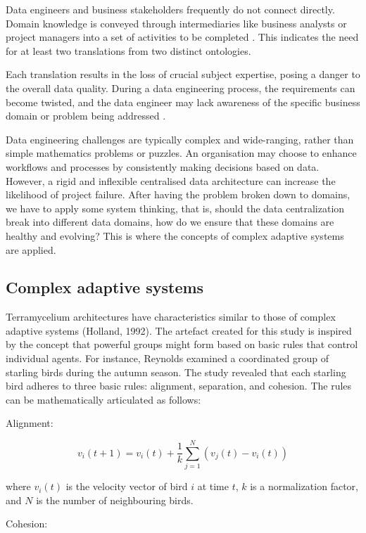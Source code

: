 \documentclass{ieeeaccess}
\begin{document}
Data engineers and business stakeholders frequently do not connect directly. Domain knowledge is conveyed through intermediaries like business analysts or project managers into a set of activities to be completed \cite{khrononov2021learning}. This indicates the need for at least two translations from two distinct ontologies.

Each translation results in the loss of crucial subject expertise, posing a danger to the overall data quality. During a data engineering process, the requirements can become twisted, and the data engineer may lack awareness of the specific business domain or problem being addressed \cite{khononov2021learning}.

Data engineering challenges are typically complex and wide-ranging, rather than simple mathematics problems or puzzles. An organisation may choose to enhance workflows and processes by consistently making decisions based on data. However, a rigid and inflexible centralised data architecture can increase the likelihood of project failure. After having the problem broken down to domains, we have to apply some system thinking, that is, should the data centralization break into different data domains, how do we ensure that these domains are healthy and evolving? This is where the concepts of complex adaptive systems are applied.

\subsection{Complex adaptive systems}

Terramycelium architectures have characteristics similar to those of complex adaptive systems (Holland, 1992). The artefact created for this study is inspired by the concept that powerful groups might form based on basic rules that control individual agents. For instance, Reynolds \cite{reynolds1987flocks} examined a coordinated group of starling birds during the autumn season. The study revealed that each starling bird adheres to three basic rules: alignment, separation, and cohesion. The rules can be mathematically articulated as follows:

Alignment:

$$ v_i(t+1) = v_i(t) + \frac{1}{k} \sum_{j=1}^{N} (v_j(t) - v_i(t)) $$

where $v_i(t)$ is the velocity vector of bird $i$ at time $t$, $k$ is a normalization factor, and $N$ is the number of neighbouring birds.

Cohesion:
\end{document}
